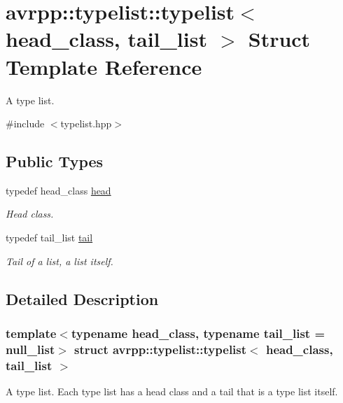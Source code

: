 \hypertarget{structavrpp_1_1typelist_1_1typelist}{
\section{avrpp::typelist::typelist$<$ head\_\-class, tail\_\-list $>$ Struct Template Reference}
\label{structavrpp_1_1typelist_1_1typelist}
}


A type list.  




{\ttfamily \#include $<$typelist.hpp$>$}

\subsection*{Public Types}
\begin{DoxyCompactItemize}
\item 
typedef head\_\-class \hyperlink{structavrpp_1_1typelist_1_1typelist_a9c0f623f6451953e74189705063ad2fb}{head}
\begin{DoxyCompactList}\small\item\em Head class. \item\end{DoxyCompactList}\item 
typedef tail\_\-list \hyperlink{structavrpp_1_1typelist_1_1typelist_ae9190439f5b2a89f0b63158bd70a5807}{tail}
\begin{DoxyCompactList}\small\item\em Tail of a list, a list itself. \item\end{DoxyCompactList}\end{DoxyCompactItemize}


\subsection{Detailed Description}
\subsubsection*{template$<$typename head\_\-class, typename tail\_\-list = null\_\-list$>$ struct avrpp::typelist::typelist$<$ head\_\-class, tail\_\-list $>$}

A type list. Each type list has a head class and a tail that is a type list itself. 

